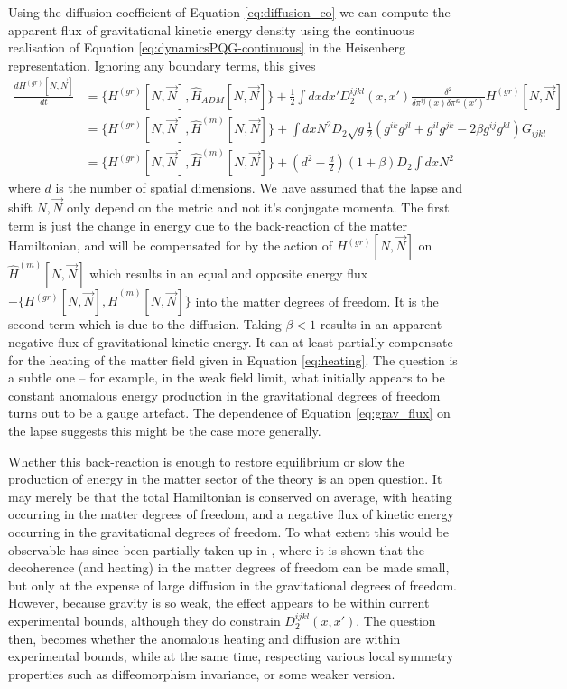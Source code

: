 \documentclass[aps,pra,showpacs,citeautoscript,amsmath,amssymb,floatfix,superscriptaddress,bbm, verbatim,amsfonts,changes,10pt,nofootinbib,longbibliography]{revtex4-1}
\def\Hq{\hat{H}}
\def\gravham{H^{(gr)}}
\def\qmatterham{\hat{H}^{(m)}}
\def\lapsh{[N,\vec{N}]}
\def\cqadm{{\Hq_{ADM}}}
\begin{document}
Using the diffusion coefficient of Equation \eqref{eq:diffusion_co} we can compute the apparent flux of gravitational kinetic energy density using the continuous realisation of Equation \eqref{eq:dynamicsPQG-continuous}  
in the Heisenberg representation. Ignoring any boundary terms, this gives
\begin{align}
\frac{d\gravham\lapsh}{dt}&=\{\gravham\lapsh,\cqadm\lapsh\}
+\frac{1}{2}\int dx dx' D_2^{ijkl}(x,x')\frac{\delta^2}{\delta\pi^{ij}(x)\delta\pi^{kl}(x')}\gravham\lapsh
\nonumber\\
&=\{\gravham\lapsh,\qmatterham\lapsh\}+\int dx N^2 D_2 \sqrt{g}
\frac{1}{2}\left(g^{ik}g^{jl}+g^{il}g^{jk}-2\beta g^{ij}g^{kl}\right)G_{ijkl}
\nonumber\\
&=\{\gravham\lapsh,\qmatterham\lapsh\}
+(d^2-\frac{d}{2})(1+\beta) D_2\int dx N^2\label{eq:grav_flux}
\end{align}
where $d$ is the number of spatial dimensions. We have assumed that the lapse and shift $N,\vec{N}$ only depend on the metric and not it's conjugate momenta. The first term
 is just the change in energy due to the back-reaction of the matter Hamiltonian, and will be compensated for by the action of $\gravham\lapsh$ on $\qmatterham\lapsh$
which results in an equal and opposite energy flux
 $-\{\gravham\lapsh,\qmatterham\lapsh\}$ into the matter degrees of freedom.  It is the second term which is due to the diffusion. Taking $\beta<1$ results in an apparent negative flux of gravitational kinetic energy. It can at least partially compensate for the heating of the matter field given in Equation \eqref{eq:heating}.
The question is a subtle one -- for example, in the weak field limit, what initially appears to be constant anomalous energy production in the gravitational degrees of freedom turns out to be a gauge artefact\cite{layton2023weak}. The dependence of Equation \eqref{eq:grav_flux} on the lapse suggests this might be the case more generally.
	
Whether this back-reaction is enough to restore equilibrium or slow the production of energy in the matter sector of the theory is an open question. It may merely be that the total Hamiltonian is conserved on average, with heating occurring in the matter degrees of freedom, and a negative flux of kinetic energy occurring in the gravitational degrees of freedom.
To what extent this would be observable has since been partially taken up in \cite{oppenheim2021gravitationally}, where it is shown that the decoherence (and heating) in the matter degrees of freedom can be made small, but only at the expense of large diffusion in the gravitational degrees of freedom. However, because gravity is so weak, the effect appears to be within current experimental bounds, although they do constrain $D_2^{ijkl}(x,x')$. %
The question then, becomes whether the anomalous heating and diffusion are within experimental bounds, while at the same time, respecting various local symmetry properties such as diffeomorphism invariance, or some weaker version. 
\end{document}

